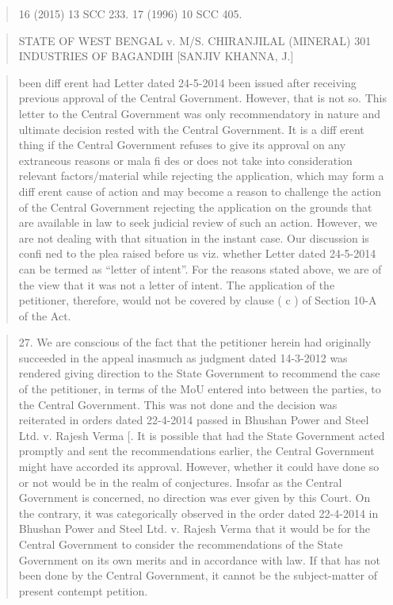 \documentclass[12pt,a4paper]{article}
\newenvironment{judgequote}
  {\begin{quote}\small}
  {\end{quote}}
\begin{document}
\begin{judgequote}
16 (2015) 13 SCC 233.
17 (1996) 10 SCC 405.
\end{judgequote}



\begin{judgequote}
STATE OF WEST BENGAL v. M/S. CHIRANJILAL (MINERAL) 301
INDUSTRIES OF BAGANDIH [SANJIV KHANNA, J.]
\end{judgequote}

\begin{judgequote}
been diff erent had Letter dated 24-5-2014 been issued after receiving
previous approval of the Central Government. However, that is not so.
This letter to the Central Government was only recommendatory in
nature and ultimate decision rested with the Central Government. It is a
diff erent thing if the Central Government refuses to give its approval on
any extraneous reasons or mala fi des or does not take into consideration
relevant factors/material while rejecting the application, which may
form a diff erent cause of action and may become a reason to challenge
the action of the Central Government rejecting the application on the
grounds that are available in law to seek judicial review of such an
action. However, we are not dealing with that situation in the instant
case. Our discussion is confi ned to the plea raised before us viz.
whether Letter dated 24-5-2014 can be termed as ``letter of intent''.
For the reasons stated above, we are of the view that it was not a letter
of intent. The application of the petitioner, therefore, would not be
covered by clause ( c ) of Section 10-A of the Act.
\end{judgequote}

\begin{judgequote}
27. We are conscious of the fact that the petitioner herein had originally
succeeded in the appeal inasmuch as judgment dated 14-3-2012 was
rendered giving direction to the State Government to recommend
the case of the petitioner, in terms of the MoU entered into between
the parties, to the Central Government. This was not done and the
decision was reiterated in orders dated 22-4-2014 passed in Bhushan
Power and Steel Ltd. v. Rajesh Verma [. It is possible that had the
State Government acted promptly and sent the recommendations
earlier, the Central Government might have accorded its approval.
However, whether it could have done so or not would be in the realm
of conjectures. Insofar as the Central Government is concerned,
no direction was ever given by this Court. On the contrary, it was
categorically observed in the order dated 22-4-2014 in Bhushan
Power and Steel Ltd. v. Rajesh Verma that it would be for the Central
Government to consider the recommendations of the State Government
on its own merits and in accordance with law. If that has not been done
by the Central Government, it cannot be the subject-matter of present
contempt petition.
\end{judgequote}
\end{document}
